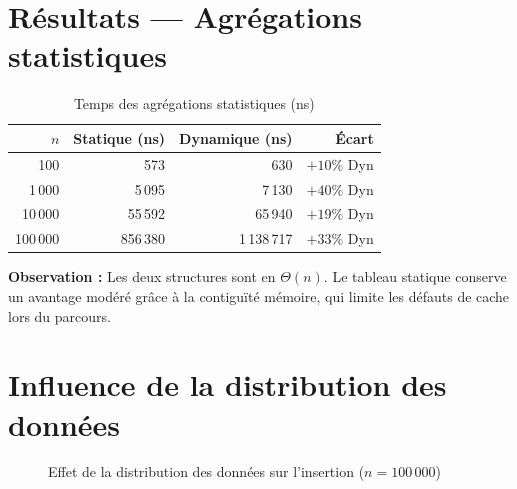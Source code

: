 \documentclass[12pt,a4paper]{report}
\begin{document}
\section{Résultats — Agrégations statistiques}

\begin{table}[H]
\centering
\caption{Temps des agrégations statistiques (ns)}
\label{tab:agg}
\renewcommand{\arraystretch}{1.2}
\begin{tabular}{rrrr}
\toprule
$n$ & Statique (ns) & Dynamique (ns) & Écart \\
\midrule
100       &     573  &     630  & $+10\%$ Dyn \\
1\,000    &   5\,095 &   7\,130 & $+40\%$ Dyn \\
10\,000   &  55\,592 &  65\,940 & $+19\%$ Dyn \\
100\,000  & 856\,380 & 1\,138\,717 & $+33\%$ Dyn \\
\bottomrule
\end{tabular}
\end{table}

\begin{boiteResultat}
\textbf{Observation :} Les deux structures sont en $\Theta(n)$. Le tableau statique conserve un avantage modéré grâce à la contiguïté mémoire, qui limite les défauts de cache lors du parcours.
\end{boiteResultat}

\section{Influence de la distribution des données}

\begin{figure}[H]
\centering
{}
\caption{Effet de la distribution des données sur l'insertion ($n=100\,000$)}
\label{fig:distribution}
\end{figure}
\end{document}
